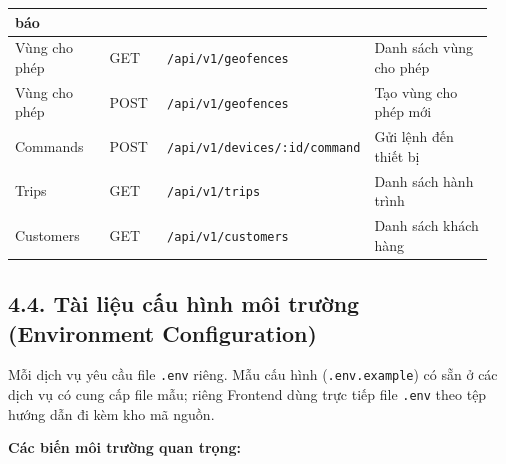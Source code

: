 \documentclass[a4paper]{extarticle}
\begin{document}
{\begin{longtable}{|L{0.226\linewidth}|L{0.137\linewidth}|L{0.204\linewidth}|L{0.387\linewidth}|}
báo \\\hline
Vùng cho phép & GET & \nolinkurl{/api/v1/geofences} & Danh sách vùng cho phép \\\hline
Vùng cho phép & POST & \nolinkurl{/api/v1/geofences} & Tạo vùng cho phép mới \\\hline
Commands & POST & \nolinkurl{/api/v1/devices/:id/command} & Gửi lệnh đến
thiết bị \\\hline
Trips & GET & \nolinkurl{/api/v1/trips} & Danh sách hành trình \\\hline
Customers & GET & \nolinkurl{/api/v1/customers} & Danh sách khách hàng \\\hline
\end{longtable}
}


\subsection{4.4. Tài liệu cấu hình môi trường (Environment
Configuration)}\label{44-tuxe0i-liux1ec7u-cux1ea5u-huxecnh-muxf4i-trux1b0ux1eddng-environment-configuration}

Mỗi dịch vụ yêu cầu file \texttt{.env} riêng. Mẫu cấu hình
(\texttt{.env.example}) có sẵn ở các dịch vụ có cung cấp file mẫu; riêng
Frontend dùng trực tiếp file \texttt{.env} theo tệp hướng dẫn đi kèm kho
mã nguồn.

\textbf{Các biến môi trường quan trọng:}
\end{document}
